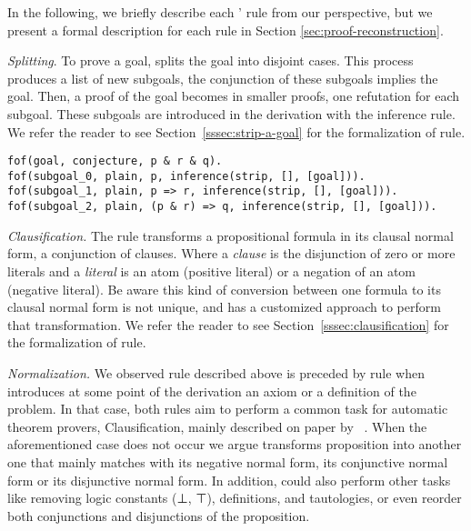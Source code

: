 In the following, we briefly describe each \Metis' rule from our perspective, but we present a formal description for each rule in Section \ref{sec:proof-reconstruction}.

\vskip 2mm


\textit{Splitting}. To prove a goal, \Metis splits the goal into
disjoint cases. This process produces a list of new subgoals, the
conjunction of these subgoals implies the goal. Then, a proof of the
goal becomes in smaller proofs, one refutation for each subgoal.
These subgoals are introduced in the \TSTP derivation with the \strip
inference rule. We refer the reader to see Section~\ref{sssec:strip-a-goal} for the formalization of \strip rule.

\begin{verbatim}
fof(goal, conjecture, p & r & q).
fof(subgoal_0, plain, p, inference(strip, [], [goal])).
fof(subgoal_1, plain, p => r, inference(strip, [], [goal])).
fof(subgoal_2, plain, (p & r) => q, inference(strip, [], [goal])).
\end{verbatim}


\textit{Clausification.} The \clausify rule transforms a
propositional formula in its clausal normal form, a conjunction
of clauses. Where a \emph{clause} is the disjunction of zero or more
literals and a \emph{literal} is an atom (positive literal) or a
negation of an atom (negative literal). Be aware this kind of conversion between one formula to its clausal normal form is not unique, and \Metis has a customized approach to perform that transformation. We refer the reader to see Section~\ref{sssec:clausification} for the formalization of \clausify rule.

\vskip 2mm


\textit{Normalization.} We observed \clausify rule described above is preceded by \canonicalize rule when \Metis introduces at some point of the derivation an axiom or a definition of the problem. In that case, both rules aim to perform a common task for
automatic theorem provers, Clausification, mainly described on paper
by \citeauthor{Sutcliffe1996}~\cite{Sutcliffe1996}. When the
aforementioned case does not occur we argue \canonicalize transforms
proposition into another one that mainly matches with its negative
normal form, its conjunctive normal form or its disjunctive normal
form. In addition, \canonicalize could also perform other tasks like
removing logic constants (⊥, ⊤), definitions, and tautologies, or even reorder both conjunctions and disjunctions of the proposition.

